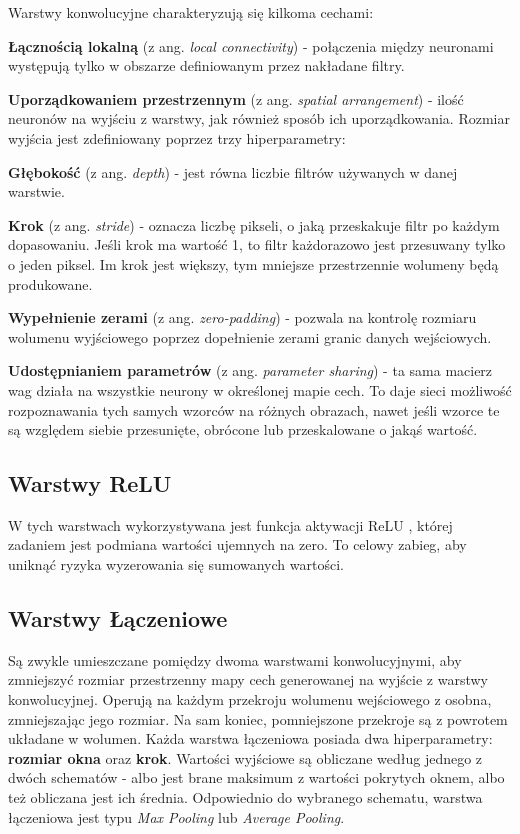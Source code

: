 Warstwy konwolucyjne charakteryzują się kilkoma cechami:
\begin{enumerate*}
\item \textbf{Łącznością lokalną} (z ang. \textit{local connectivity}) - połączenia między neuronami występują tylko w obszarze definiowanym przez nakładane filtry.
\item \textbf{Uporządkowaniem przestrzennym} (z ang. \textit{spatial arrangement}) - ilość neuronów na wyjściu z warstwy, jak również sposób ich uporządkowania. Rozmiar wyjścia jest zdefiniowany poprzez trzy hiperparametry:
\begin{enumerate*}
\item \textbf{Głębokość} (z ang. \textit{depth}) - jest równa liczbie filtrów używanych w danej warstwie.
\item \textbf{Krok} (z ang. \textit{stride}) - oznacza liczbę pikseli, o jaką przeskakuje filtr po każdym dopasowaniu. Jeśli krok ma wartość 1, to filtr każdorazowo jest przesuwany tylko o jeden piksel. Im krok jest większy, tym mniejsze przestrzennie wolumeny będą produkowane.
\item \textbf{Wypełnienie zerami} (z ang. \textit{zero-padding}) - pozwala na kontrolę rozmiaru wolumenu wyjściowego poprzez dopełnienie zerami granic danych wejściowych.
\end{enumerate*}
\item \textbf{Udostępnianiem parametrów} (z ang. \textit{parameter sharing}) - ta sama macierz wag działa na wszystkie neurony w określonej mapie cech. To daje sieci możliwość rozpoznawania tych samych wzorców na różnych obrazach, nawet jeśli wzorce te są względem siebie przesunięte, obrócone lub przeskalowane o jakąś wartość. 
\end{enumerate*}

\subsection{Warstwy ReLU}
W tych warstwach wykorzystywana jest funkcja aktywacji ReLU \cite{brownlee:reluIntroduction}, której zadaniem jest podmiana wartości ujemnych na zero. To celowy zabieg, aby uniknąć ryzyka wyzerowania się sumowanych wartości.

\subsection{Warstwy Łączeniowe}
Są zwykle umieszczane pomiędzy dwoma warstwami konwolucyjnymi, aby zmniejszyć rozmiar przestrzenny mapy cech generowanej na wyjście z warstwy konwolucyjnej. Operują na każdym przekroju wolumenu wejściowego z osobna, zmniejszając jego rozmiar. Na sam koniec, pomniejszone przekroje są z powrotem układane w wolumen. Każda warstwa łączeniowa posiada dwa hiperparametry: \textbf{rozmiar okna} oraz \textbf{krok}. Wartości wyjściowe są obliczane według jednego z dwóch schematów - albo jest brane maksimum z wartości pokrytych oknem, albo też obliczana jest ich średnia.
Odpowiednio do wybranego schematu, warstwa łączeniowa jest typu \textit{Max Pooling} lub \textit{Average Pooling}.

